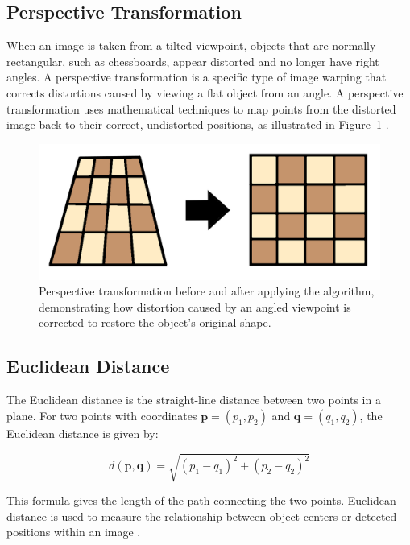 \subsection*{Perspective Transformation}
\label{subsec:perspective-transformation}

When an image is taken from a tilted viewpoint, objects that are normally rectangular, such as chessboards, appear distorted and no longer have right angles. A perspective transformation is a specific type of image warping that corrects distortions caused by viewing a flat object from an angle. A perspective transformation uses mathematical techniques to map points from the distorted image back to their correct, undistorted positions, as illustrated in Figure~\ref{fig:perspective-transformation} \cite{nvidia:perspective-transform}.

\begin{figure}[h!]
    \centering
    \includegraphics[width=0.75\linewidth]{figures/theory/image-recognition/perspective-transformation.png}
    \caption[Perspective transformation before and after]{Perspective transformation before and after applying the algorithm, demonstrating how distortion caused by an angled viewpoint is corrected to restore the object’s original shape.}
    \label{fig:perspective-transformation}
\end{figure}

\subsection*{Euclidean Distance}
\label{subsec:euclidean-distance}

The Euclidean distance is the straight-line distance between two points in a plane. For two points with coordinates \( \mathbf{p} = (p_1, p_2) \) and \( \mathbf{q} = (q_1, q_2) \), the Euclidean distance is given by:

\[
d(\mathbf{p}, \mathbf{q}) = \sqrt{(p_1 - q_1)^2 + (p_2 - q_2)^2}
\]

This formula gives the length of the path connecting the two points. Euclidean distance is used to measure the relationship between object centers or detected positions within an image \cite{cohen:precalculus}.


